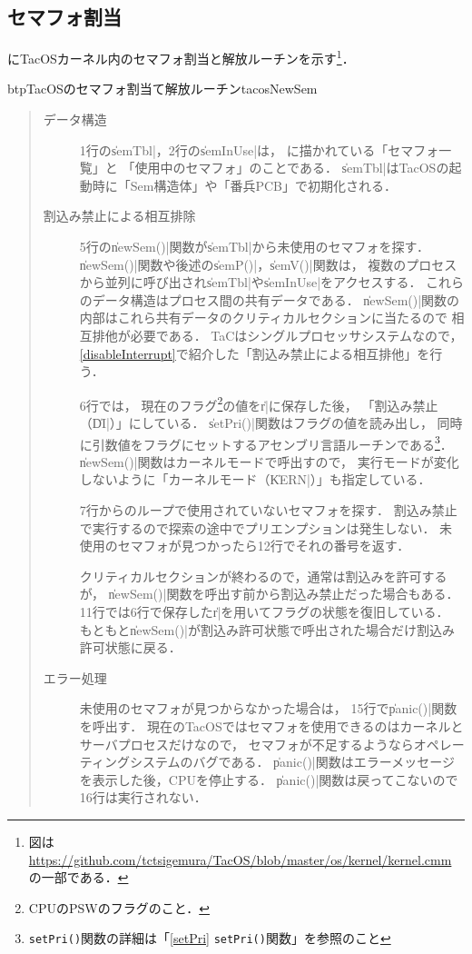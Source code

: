 \subsection{セマフォ割当}
にTacOSカーネル内のセマフォ割当と解放ルーチンを示す\footnote{図は
\url{https://github.com/tctsigemura/TacOS/blob/master/os/kernel/kernel.cmm}
の一部である．}．

\begin{myfig}{btp}{TacOSのセマフォ割当て解放ルーチン}{tacosNewSem}

\end{myfig}

\begin{quote}
\begin{description}
\item [データ構造]
1行の\|semTbl|，2行の\|semInUse|は，
に描かれている「セマフォ一覧」と
「使用中のセマフォ」のことである．
\|semTbl|はTacOSの起動時に「Sem構造体」や「番兵PCB」で初期化される．

\item [割込み禁止による相互排除]
5行の\|newSem()|関数が\|semTbl|から未使用のセマフォを探す．
\|newSem()|関数や後述の\|semP()|，\|semV()|関数は，
複数のプロセスから並列に呼び出され\|semTbl|や\|semInUse|をアクセスする．
これらのデータ構造はプロセス間の共有データである．
\|newSem()|関数の内部はこれら共有データのクリティカルセクションに当たるので
相互排他が必要である．
TaCはシングルプロセッサシステムなので，
\ref{disableInterrupt}で紹介した「割込み禁止による相互排他」を行う．

6行では，
現在のフラグ\footnote{CPUのPSWのフラグのこと．}の値を\|r|に保存した後，
「割込み禁止（\|DI|）」にしている．
\|setPri()|関数はフラグの値を読み出し，
同時に引数値をフラグにセットするアセンブリ言語ルーチンである\footnote{
{\tt setPri()}関数の詳細は「\ref{setPri} {\tt setPri()}関数」を参照のこと}．
\|newSem()|関数はカーネルモードで呼出すので，
実行モードが変化しないように「カーネルモード（\|KERN|）」も指定している．

7行からのループで使用されていないセマフォを探す．
割込み禁止で実行するので探索の途中でプリエンプションは発生しない．
未使用のセマフォが見つかったら12行でそれの番号を返す．

クリティカルセクションが終わるので，通常は割込みを許可するが，
\|newSem()|関数を呼出す前から割込み禁止だった場合もある．
11行では6行で保存した\|r|を用いてフラグの状態を復旧している．
もともと\|newSem()|が割込み許可状態で呼出された場合だけ割込み許可状態に戻る．

\item [エラー処理]
未使用のセマフォが見つからなかった場合は，
15行で\|panic()|関数を呼出す．
現在のTacOSではセマフォを使用できるのはカーネルとサーバプロセスだけなので，
セマフォが不足するようならオペレーティングシステムのバグである．
\|panic()|関数はエラーメッセージを表示した後，CPUを停止する．
\|panic()|関数は戻ってこないので16行は実行されない．


\end{description}
\end{quote}
